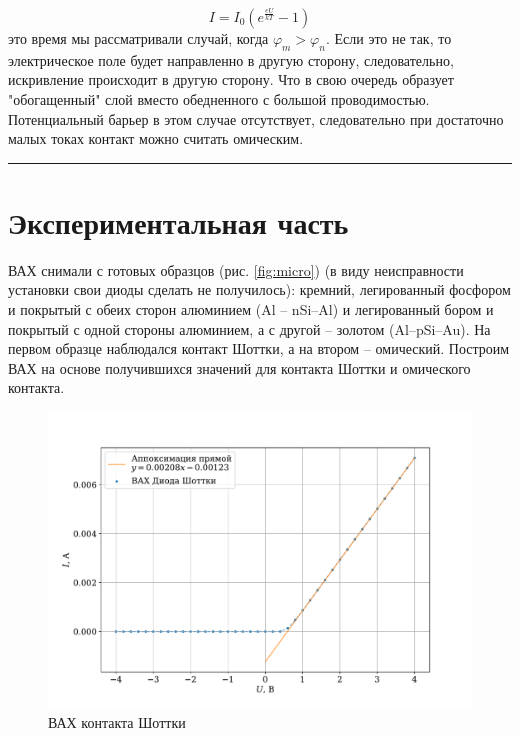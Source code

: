\documentclass[a4paper,12pt]{article} %
\begin{document}
\begin{equation}
    I=I_0(e^\frac{eU}{kT}-1)
\end{equation}
 это время мы рассматривали случай, когда $\varphi_m>\varphi_n$. Если это не так, то электрическое поле будет направленно в другую сторону, следовательно, искривление происходит в другую сторону. Что в свою очередь образует "обогащенный" слой вместо обедненного с большой проводимостью. Потенциальный барьер в этом случае отсутствует, следовательно при достаточно малых токах контакт можно считать омическим.

\medskip\hrule\medskip

\section{Экспериментальная часть}

ВАХ снимали с готовых образцов (рис. \ref{fig:micro}) (в виду неисправности установки свои диоды сделать не получилось): кремний, легированный фосфором и покрытый с обеих сторон алюминием (Al – nSi–Al) и легированный бором и покрытый с одной стороны алюминием, а с другой – золотом (Al–pSi–Au). На первом образце наблюдался контакт Шоттки, а на втором – омический. 
Построим ВАХ на основе получившихся значений для контакта Шоттки и омического контакта.

    \begin{figure}[h!]
		\centering
		\includegraphics[width=\textwidth]{vac_diode.pdf}
		\caption{ВАХ контакта Шоттки}
		\label{graph1}
	\end{figure}
	
\end{document}

